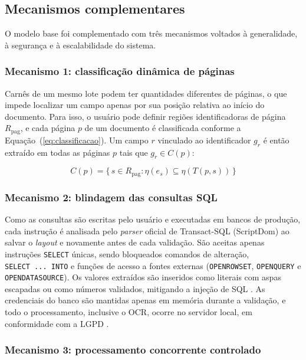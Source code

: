 \documentclass[article,12pt,oneside,a4paper,english,brazil]{abntex2}
\begin{document}
\subsection{Mecanismos complementares}

O modelo base foi complementado com três mecanismos voltados à generalidade, à
segurança e à escalabilidade do sistema.

\subsubsection{Mecanismo 1: classificação dinâmica de páginas}

Carnês de um mesmo lote podem ter quantidades diferentes de páginas, o que impede
localizar um campo apenas por sua posição relativa ao início do documento. Para isso, o
usuário pode definir regiões identificadoras de página $R_{\mathrm{pag}}$, e cada página
$p$ de um documento é classificada conforme a Equação~(\ref{eq:classificacao}). Um campo
$r$ vinculado ao identificador $g_r$ é então extraído em todas as páginas $p$ tais que
$g_r \in C(p)$:

\begin{equation}\label{eq:classificacao}
C(p) = \{\, s \in R_{\mathrm{pag}} : \eta(e_s) \subseteq \eta(T(p, s)) \,\}
\end{equation}

\subsubsection{Mecanismo 2: blindagem das consultas SQL}

Como as consultas são escritas pelo usuário e executadas em bancos de produção, cada
instrução é analisada pelo \textit{parser} oficial de Transact-SQL (ScriptDom)
\cite{microsoftscriptdom} ao salvar o \textit{layout} e novamente antes de cada
validação. São aceitas apenas instruções \texttt{SELECT} únicas, sendo bloqueados
comandos de alteração, \texttt{SELECT~...~INTO} e funções de acesso a fontes externas
(\texttt{OPENROWSET}, \texttt{OPENQUERY} e \texttt{OPENDATASOURCE}). Os valores
extraídos são inseridos como literais com aspas escapadas ou como números validados,
mitigando a injeção de SQL \cite{owasp}. As credenciais do banco são mantidas apenas em
memória durante a validação, e todo o processamento, inclusive o OCR, ocorre no
servidor local, em conformidade com a LGPD \cite{brasil2018lgpd}.

\subsubsection{Mecanismo 3: processamento concorrente controlado}
\end{document}
